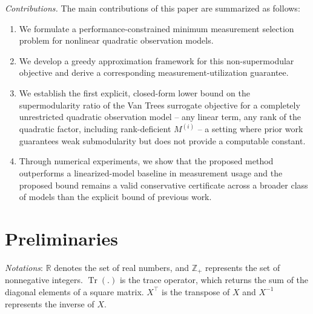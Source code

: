 \documentclass[letterpaper, 10 pt, conference]{ieeeconf}  %
\begin{document}

\textit{Contributions.} The main contributions of this paper are summarized as follows:
\begin{enumerate}
    \item We formulate a performance-constrained minimum measurement selection problem for nonlinear quadratic observation models.
    \item We develop a greedy approximation framework for this non-supermodular objective and derive a corresponding measurement-utilization guarantee.
    \item We establish the first explicit, closed-form lower bound on the supermodularity ratio of the Van Trees surrogate objective for a completely unrestricted quadratic observation model -- any linear term, any rank of the quadratic factor, including rank-deficient $M^{(i)}$ -- a setting where prior work \cite{c19} guarantees weak submodularity but does not provide a computable constant.
    \item Through numerical experiments, we show that the proposed method outperforms a linearized-model baseline in measurement usage and the proposed bound remains a valid conservative certificate across a broader class of models than the explicit bound of previous work.
\end{enumerate}


\section{Preliminaries}

\noindent \textit{Notations}: $\mathbb{R}$ denotes the set of real numbers, and $\mathbb{Z}_+$ represents the set of nonnegative integers. $\operatorname{Tr}(.)$ is the trace operator, which returns the sum of the diagonal elements of a square matrix. $X^\top$ is the transpose of $X$ and $X^{-1}$ represents the inverse of $X$. \\
\end{document}
